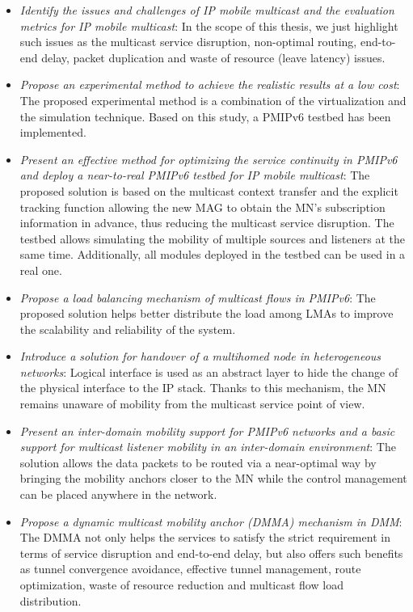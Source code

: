 \begin{itemize}
\item \textit{Identify the issues and challenges of IP mobile multicast and the evaluation metrics for IP mobile multicast}: In the scope of this thesis, we just highlight such issues as the multicast service disruption, non-optimal routing, end-to-end delay, packet duplication and waste of resource (leave latency) issues. 
\item \textit{Propose an experimental method to achieve the realistic results at a low cost}: The proposed experimental method is a combination of the virtualization and the simulation technique. Based on this study, a PMIPv6 testbed has been implemented. 
\item \textit{Present an effective method for optimizing the service continuity in PMIPv6 and deploy a near-to-real PMIPv6 testbed for IP mobile multicast}: The proposed solution is based on the multicast context transfer and the explicit tracking function allowing the new MAG to obtain the MN's subscription information in advance, thus reducing the multicast service disruption. The testbed allows simulating the mobility of multiple sources and listeners at the same time. Additionally, all modules deployed in the testbed can be used in a real one. 
\item \textit{Propose a load balancing mechanism of multicast flows in PMIPv6}: The proposed solution helps better distribute the load among LMAs to improve the scalability and reliability of the system. 
\item \textit{Introduce a solution for handover of a multihomed node in heterogeneous networks}: Logical interface is used as an abstract layer to hide the change of the physical interface to the IP stack. Thanks to this mechanism, the MN remains unaware of mobility from the multicast service point of view.  
\item \textit{Present an inter-domain mobility support for PMIPv6 networks and a basic support for multicast listener mobility in an inter-domain environment}: The solution allows the data packets to be routed via a near-optimal way by bringing the mobility anchors closer to the MN while the control management can be placed anywhere in the network.
\item \textit{Propose a dynamic multicast mobility anchor (DMMA) mechanism in DMM}: The DMMA not only helps the services to satisfy the strict requirement in terms of service disruption and end-to-end delay, but also offers such benefits as tunnel convergence avoidance, effective tunnel management, route optimization, waste of resource reduction and multicast flow load distribution.
\end{itemize}

